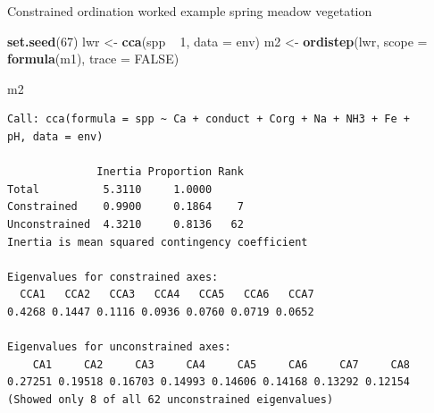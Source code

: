 \documentclass[10pt,ignorenonframetext,compress, aspectratio=169]{beamer}
\newenvironment{Shaded}{\begin{snugshade}}{\end{snugshade}}
\newcommand{\KeywordTok}[1]{\textcolor[rgb]{0.13,0.29,0.53}{\textbf{{#1}}}}
\newcommand{\DataTypeTok}[1]{\textcolor[rgb]{0.13,0.29,0.53}{{#1}}}
\newcommand{\DecValTok}[1]{\textcolor[rgb]{0.00,0.00,0.81}{{#1}}}
\newcommand{\StringTok}[1]{\textcolor[rgb]{0.31,0.60,0.02}{{#1}}}
\newcommand{\OtherTok}[1]{\textcolor[rgb]{0.56,0.35,0.01}{{#1}}}
\newcommand{\NormalTok}[1]{{#1}}
\begin{document}
\begin{frame}[fragile]{Constrained ordination worked example \textbar{}
spring meadow vegetation}

\tiny

\begin{Shaded}
\begin{Highlighting}[]
\KeywordTok{set.seed}\NormalTok{(}\DecValTok{67}\NormalTok{)}
\NormalTok{lwr <-}\StringTok{ }\KeywordTok{cca}\NormalTok{(spp ~}\StringTok{ }\DecValTok{1}\NormalTok{, }\DataTypeTok{data =} \NormalTok{env)}
\NormalTok{m2 <-}\StringTok{ }\KeywordTok{ordistep}\NormalTok{(lwr, }\DataTypeTok{scope =} \KeywordTok{formula}\NormalTok{(m1), }\DataTypeTok{trace =} \OtherTok{FALSE}\NormalTok{)}
\end{Highlighting}
\end{Shaded}

\begin{Shaded}
\begin{Highlighting}[]
\NormalTok{m2}
\end{Highlighting}
\end{Shaded}

\begin{verbatim}
Call: cca(formula = spp ~ Ca + conduct + Corg + Na + NH3 + Fe +
pH, data = env)

              Inertia Proportion Rank
Total          5.3110     1.0000     
Constrained    0.9900     0.1864    7
Unconstrained  4.3210     0.8136   62
Inertia is mean squared contingency coefficient 

Eigenvalues for constrained axes:
  CCA1   CCA2   CCA3   CCA4   CCA5   CCA6   CCA7 
0.4268 0.1447 0.1116 0.0936 0.0760 0.0719 0.0652 

Eigenvalues for unconstrained axes:
    CA1     CA2     CA3     CA4     CA5     CA6     CA7     CA8 
0.27251 0.19518 0.16703 0.14993 0.14606 0.14168 0.13292 0.12154 
(Showed only 8 of all 62 unconstrained eigenvalues)
\end{verbatim}

\normalsize

\end{frame}
\end{document}
